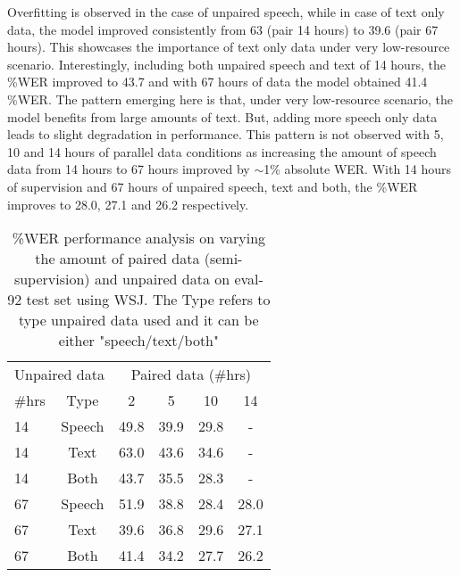 \documentclass[a4paper]{article}
\begin{document}
Overfitting is observed in the case of unpaired speech, while in case of text only data, the model improved consistently from 63 (pair 14 hours) to 39.6 (pair 67 hours). This showcases the importance of text only data under very low-resource scenario. Interestingly,  including both unpaired speech and text of 14 hours, the \%WER improved to 43.7 and with 67 hours of data the model obtained 41.4 \%WER. The pattern emerging here is that, under very low-resource scenario, the model benefits from large amounts of text. But, adding more speech only data leads to slight degradation in performance. This pattern is not observed with 5, 10 and 14 hours of parallel data conditions as increasing the amount of speech data from 14 hours to 67 hours improved by $\sim$1\% absolute WER. With 14 hours of supervision and 67 hours of unpaired speech, text and both, the \%WER improves to 28.0, 27.1 and 26.2 respectively.
\begin{table}[H]
\caption{\%WER performance analysis on varying the amount of paired data (semi-supervision) and unpaired data on eval-92 test set using WSJ. The Type refers to type unpaired data used and it can be either "speech/text/both"}\label{tab:wsj}
\centering{}\begin{tabular}{lccccc}
\hline 
\multicolumn{2}{c}{\footnotesize{}Unpaired data} & \multicolumn{4}{c}{\footnotesize{}Paired data (\#hrs)}\tabularnewline
\cline{3-6} 
{\footnotesize{}\#hrs} & {\footnotesize{}Type} & {\footnotesize{}2} & {\footnotesize{}5} & {\footnotesize{}10} & {\footnotesize{}14}\tabularnewline
\hline 
\hline 
{\footnotesize{}14}  & {\footnotesize{}Speech} & {\footnotesize{}49.8} & {\footnotesize{}39.9} & {\footnotesize{}29.8} & {\footnotesize{}-}\tabularnewline

{\footnotesize{}14}  & {\footnotesize{}Text} & {\footnotesize{}63.0} & {\footnotesize{}43.6} & {\footnotesize{}34.6} & {\footnotesize{}-}\tabularnewline

{\footnotesize{}14}  & {\footnotesize{}Both} & {\footnotesize{}43.7} & {\footnotesize{}35.5} & {\footnotesize{}28.3} & -\tabularnewline

{\footnotesize{}67}  & {\footnotesize{}Speech} & {\footnotesize{}51.9} & {\footnotesize{}38.8} & {\footnotesize{}28.4} & {\footnotesize{}28.0}\tabularnewline

{\footnotesize{}67}  & {\footnotesize{}Text} & {\footnotesize{}39.6} & {\footnotesize{}36.8} & {\footnotesize{}29.6} & {\footnotesize{}27.1}\tabularnewline

{\footnotesize{}67}  & {\footnotesize{}Both} & {\footnotesize{}41.4} & {\footnotesize{}34.2} & {\footnotesize{}27.7} & {\footnotesize{}26.2}\tabularnewline
\hline 
\end{tabular}
\end{table}
\end{document}
